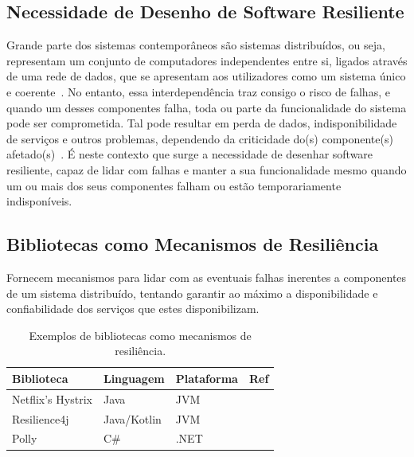 \subsection{Necessidade de Desenho de Software Resiliente}
Grande parte dos sistemas contemporâneos são sistemas distribuídos, ou seja, representam um conjunto de computadores independentes entre si, ligados através de uma rede de dados, que se apresentam aos utilizadores como um sistema único e coerente~\cite{fcc-distributed-systems}.
No entanto, essa interdependência traz consigo o risco de falhas, e quando um desses componentes falha, toda ou parte da funcionalidade do sistema pode ser comprometida.
Tal pode resultar em perda de dados, indisponibilidade de serviços e outros problemas, dependendo da criticidade do(s) componente(s) afetado(s)~\cite{cap-theorem}.
É neste contexto que surge a necessidade de desenhar software resiliente, capaz de lidar com falhas e manter a sua funcionalidade mesmo quando um ou mais dos seus componentes falham ou estão temporariamente indisponíveis.


\subsection{Bibliotecas como Mecanismos de Resiliência}
Fornecem mecanismos para lidar com as eventuais falhas inerentes a componentes de um sistema distribuído, tentando garantir ao máximo a
disponibilidade e confiabilidade dos serviços que estes disponibilizam.

\begin{table}[h]
    \centering
    \caption{Exemplos de bibliotecas como mecanismos de resiliência.}
    \label{tab:resilience_libraries}
    \begin{tabular}{|l|l|l|l|}
        \hline
        \textbf{Biblioteca} & \textbf{Linguagem} & \textbf{Plataforma} & \textbf{Ref}            \\ \hline
        Netflix's Hystrix   & Java               & JVM                 & ~\cite{netflix-hystrix} \\ \hline
        Resilience4j        & Java/Kotlin        & JVM                 & ~\cite{resilience4j}    \\ \hline
        Polly               & C\#                & .NET                & ~\cite{polly-dotnet}    \\
        \hline
    \end{tabular}
\end{table}

